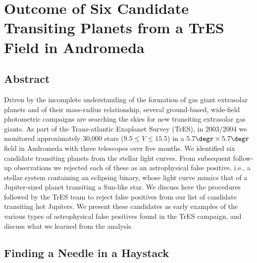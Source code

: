 \chapter[Outcome of Six Candidate Transiting Planets from a TrES Field in Andromeda]{Outcome of Six Candidate Transiting Planets from a TrES Field in Andromeda%
\protect\CFNB%
}\label{cha:and0}

\section*{Abstract}\label{cha:and0:sec:abs}

Driven by the incomplete understanding of the formation of gas giant extrasolar planets and of their mass-radius relationship, several ground-based, wide-field photometric campaigns are searching the skies for new transiting extrasolar gas giants. As part of the Trans-atlantic Exoplanet Survey (TrES), in 2003/2004 we monitored approximately 30,000 stars ($9 .5\leq V \leq 15.5$) in a $5.7\degr\times5.7\degr$ field in Andromeda with three telescopes over five months. We identified six candidate transiting planets from the stellar light curves. From subsequent follow-up observations we rejected each of these as an astrophysical false positive, i.e., a stellar system containing an eclipsing binary, whose light curve mimics that of a Jupiter-sized planet transiting a Sun-like star. We discuss here the procedures followed by the TrES team to reject false positives from our list of candidate transiting hot Jupiters. We present these candidates as early examples of the various types of astrophysical false positives found in the TrES campaign, and discuss what we learned from the analysis.

\section{Finding a Needle in a Haystack}\label{cha:and0:sec:intro}

